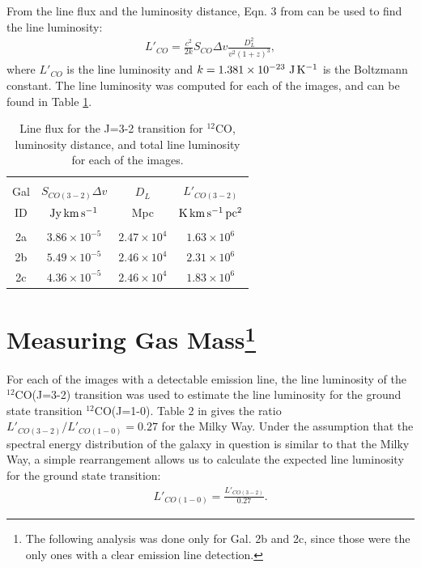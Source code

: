 \documentclass[11pt]{article}
\begin{document}
From the line flux and the luminosity distance, Eqn. 3 from \cite{Solomon1992} can be used to find the line luminosity:
\begin{align}\label{eqn:linelum}
	L'_{CO} = \frac{c^2}{2k}S_{CO}\Delta v \frac{D_L^2}{v^2 (1+z)^3},
\end{align}
where $L'_{CO}$ is the line luminosity and $k = 1.381\times 10^{-23}~{\rm J\,K^{-1}}$ is the Boltzmann constant. The line luminosity was computed for each of the images, and can be found in Table \ref{table:line_lum}.

\begin{table}[!htbp]
\centering
\begin{tabular}{cccc}
\hline \\[-0.25cm]
Gal & $S_{CO(3-2)}\Delta v$ & $D_L$ & $L'_{CO(3-2)}$ \\
ID  & $\rm{Jy\,km\,s^{-1}}$ & Mpc   & $\rm{K\,km\,s^{-1}\,pc^2}$ \\[0.1cm]
\hline \\[-0.25cm]
2a & $3.86\times 10^{-5}$ & $2.47\times 10^{4}$ & $1.63\times 10^{6}$ \\
2b & $5.49\times 10^{-5}$ & $2.46\times 10^{4}$ & $2.31\times 10^{6}$ \\
2c & $4.36\times 10^{-5}$ & $2.46\times 10^{4}$ & $1.83\times 10^{6}$ \\
\hline
\end{tabular}
\caption{Line flux for the J=3-2 transition for $^{12}$CO, luminosity distance, and total line luminosity for each of the images.}
\label{table:line_lum}
\end{table}

\section*{Measuring Gas Mass\footnote{The following analysis was done only for Gal. 2b and 2c, since those were the only ones with a clear emission line detection.}}

For each of the images with a detectable emission line, the line luminosity of the $^{12}$CO(J=3-2) transition was used to estimate the line luminosity for the ground state transition $^{12}$CO(J=1-0). Table 2 in \cite{Carilli2013} gives the ratio $L'_{CO(3-2)} / L'_{CO(1-0)} = 0.27$ for the Milky Way. Under the assumption that the spectral energy distribution of the galaxy in question is similar to that the Milky Way, a simple rearrangement allows us to calculate the expected line luminosity for the ground state transition:
\begin{align}\label{eqn:ground_linelum}
	L'_{CO(1-0)} = \frac{L'_{CO(3-2)}}{0.27}.
\end{align}
\end{document}
